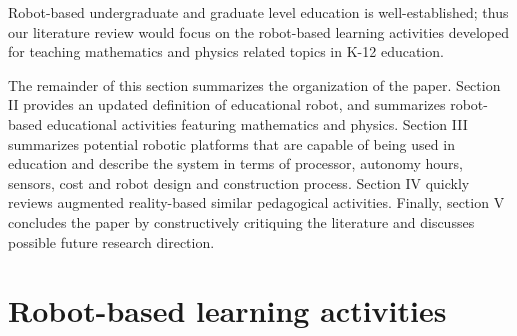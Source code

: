 \documentclass[conference]{IEEEtran}
\begin{document}
Robot-based undergraduate and graduate level education is well-established; thus our literature review would focus on 
the robot-based learning activities developed for teaching mathematics and physics related topics in K-12 education.

The remainder of this section summarizes the organization of the paper. Section II provides an updated definition of 
educational robot, and summarizes robot-based educational activities featuring mathematics and physics. Section III 
summarizes potential robotic platforms that are capable of being used in education and describe the system in terms 
of processor, autonomy hours, sensors, cost and robot design and construction process. Section IV quickly reviews 
augmented reality-based similar pedagogical activities. Finally, section V concludes the paper by constructively 
critiquing the literature and discusses possible future research direction.

\section{Robot-based learning activities}
\end{document}
